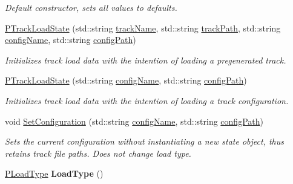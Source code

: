 \begin{DoxyCompactItemize}
\begin{DoxyCompactList}\small\item\em Default constructor, sets all values to defaults. \end{DoxyCompactList}\item 
\hyperlink{classprocedural_1_1_p_track_load_state_af14045186634c4e66692d939668b0df6}{P\-Track\-Load\-State} (std\-::string \hyperlink{classprocedural_1_1_p_track_load_state_ac7b267e5f292841da9e1f94d4e2cedaf}{track\-Name}, std\-::string \hyperlink{classprocedural_1_1_p_track_load_state_abacf1626fc5ee56db60f52a336a8c3a0}{track\-Path}, std\-::string \hyperlink{classprocedural_1_1_p_track_load_state_afd80455d3c2f9c84e2c76771d1c25e72}{config\-Name}, std\-::string \hyperlink{classprocedural_1_1_p_track_load_state_aeae302c70abe6dd787b73a08e078fe7c}{config\-Path})
\begin{DoxyCompactList}\small\item\em Initializes track load data with the intention of loading a pregenerated track. \end{DoxyCompactList}\item 
\hyperlink{classprocedural_1_1_p_track_load_state_a8c5d70fd7f2159f054094e52d2cbacc2}{P\-Track\-Load\-State} (std\-::string \hyperlink{classprocedural_1_1_p_track_load_state_afd80455d3c2f9c84e2c76771d1c25e72}{config\-Name}, std\-::string \hyperlink{classprocedural_1_1_p_track_load_state_aeae302c70abe6dd787b73a08e078fe7c}{config\-Path})
\begin{DoxyCompactList}\small\item\em Initializes track load data with the intention of loading a track configuration. \end{DoxyCompactList}\item 
void \hyperlink{classprocedural_1_1_p_track_load_state_a64817b6cdae63ad1d79633aca31ff2d9}{Set\-Configuration} (std\-::string \hyperlink{classprocedural_1_1_p_track_load_state_afd80455d3c2f9c84e2c76771d1c25e72}{config\-Name}, std\-::string \hyperlink{classprocedural_1_1_p_track_load_state_aeae302c70abe6dd787b73a08e078fe7c}{config\-Path})
\begin{DoxyCompactList}\small\item\em Sets the current configuration without instantiating a new state object, thus retains track file paths. Does not change load type. \end{DoxyCompactList}\item 
\hypertarget{classprocedural_1_1_p_track_load_state_a28651692336566aa5f2c621471b0cfa5}{\hyperlink{namespaceprocedural_a1a0de85ffebb5ee366eb8374b42edac7}{P\-Load\-Type} {\bfseries Load\-Type} ()}\label{classprocedural_1_1_p_track_load_state_a28651692336566aa5f2c621471b0cfa5}


\end{DoxyCompactItemize}
